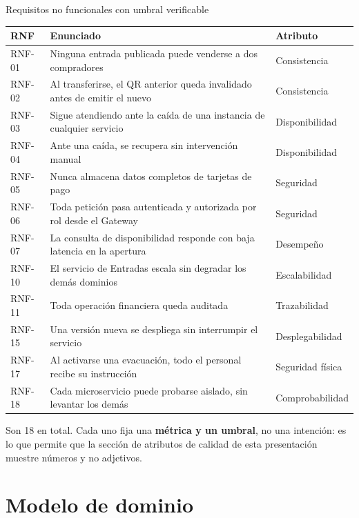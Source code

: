 \documentclass[aspectratio=169,10pt,xcolor={table}]{beamer}
\begin{document}
\begin{frame}{Requisitos no funcionales con umbral verificable}
  \scriptsize
  \begin{tabular}{C{1.3cm}L{8.4cm}L{3.4cm}}
    \toprule
    \textbf{RNF} & \textbf{Enunciado} & \textbf{Atributo} \\
    \midrule
    RNF-01 & Ninguna entrada publicada puede venderse a dos compradores & Consistencia \\
    RNF-02 & Al transferirse, el QR anterior queda invalidado antes de emitir el nuevo & Consistencia \\
    RNF-03 & Sigue atendiendo ante la caída de una instancia de cualquier servicio & Disponibilidad \\
    RNF-04 & Ante una caída, se recupera sin intervención manual & Disponibilidad \\
    RNF-05 & Nunca almacena datos completos de tarjetas de pago & Seguridad \\
    RNF-06 & Toda petición pasa autenticada y autorizada por rol desde el Gateway & Seguridad \\
    RNF-07 & La consulta de disponibilidad responde con baja latencia en la apertura & Desempeño \\
    RNF-10 & El servicio de Entradas escala sin degradar los demás dominios & Escalabilidad \\
    RNF-11 & Toda operación financiera queda auditada & Trazabilidad \\
    RNF-15 & Una versión nueva se despliega sin interrumpir el servicio & Desplegabilidad \\
    RNF-17 & Al activarse una evacuación, todo el personal recibe su instrucción & Seguridad física \\
    RNF-18 & Cada microservicio puede probarse aislado, sin levantar los demás & Comprobabilidad \\
    \bottomrule
  \end{tabular}

  \vspace{0.6em}
  \footnotesize
  Son 18 en total. Cada uno fija una \textbf{métrica y un umbral}, no una intención: es lo que
  permite que la sección de atributos de calidad de esta presentación muestre números y no
  adjetivos.
\end{frame}

\section{Modelo de dominio}
\end{document}
